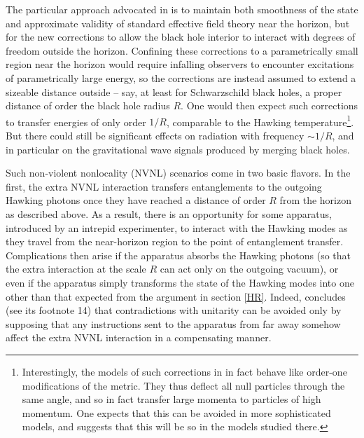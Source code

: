 \documentclass[12pt]{article}
\begin{document}
The particular approach advocated in \cite{Giddings:2011ks,Giddings:2012gc,Giddings:2013kcj} is to maintain both smoothness of the state and approximate validity of standard effective field theory near the horizon, but for the new corrections to allow the black hole interior to interact with degrees of freedom outside the horizon.  Confining these corrections to a parametrically small region near the horizon would require infalling observers to encounter excitations of parametrically large energy, so the corrections are instead assumed to extend a sizeable distance outside -- say, at least for Schwarzschild black holes,  a proper distance of order the black hole radius $R$.  One would then expect such corrections to transfer energies of only order $1/R$, comparable to the Hawking temperature\footnote{Interestingly, the models of such corrections in \cite{Giddings:2014nla} in fact behave like order-one modifications of the metric.  They thus deflect all null particles through the same angle, and so in fact transfer large momenta to particles of high momentum. One expects that this can be avoided in more sophisticated models, and \cite{Giddings:2017mym} suggests that this will be so in the models studied there.}. But there could still be significant effects on radiation with frequency $\sim 1/R$, and in particular on the gravitational wave signals produced by merging black holes.

Such non-violent nonlocality (NVNL) scenarios come in two basic flavors.  In the first, the extra NVNL interaction transfers entanglements to the outgoing Hawking photons once they have reached a distance of order $R$ from the horizon as described above.  As a result, there is an opportunity for some apparatus, introduced by an intrepid experimenter, to interact with the Hawking modes as they travel from the near-horizon region to the point of entanglement transfer.  Complications then arise \cite{Almheiri:2012rt} if the apparatus absorbs the Hawking photons (so that the extra interaction at the scale $R$ can act only on the outgoing vacuum), or even \cite{Almheiri:2013hfa} if the apparatus simply transforms the state of the Hawking modes into one other than that expected from the argument in section \ref{HR}.   Indeed, \cite{Almheiri:2013hfa} concludes (see its footnote 14) that contradictions with unitarity can be avoided only by supposing that any instructions sent to the apparatus from far away somehow affect the extra NVNL interaction in a compensating manner.
\end{document}
